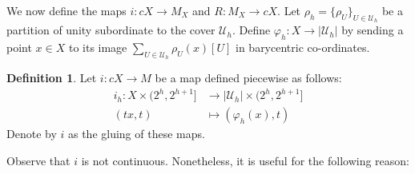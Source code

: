 \documentclass[a4paper,11pt]{article}
\theoremstyle{definition}
\newtheorem{definition}{Definition}[section]
\theoremstyle{plain}
\theoremstyle{remark}
\begin{document}
We now define the maps $i: cX\rightarrow M_{X}$ and $R:M_{X}\rightarrow cX$. Let $\rho_{h}= \{\rho_{U}\}_{U\in \mathcal{U}_{h}}$ be a partition of unity subordinate to the cover $\mathcal{U}_{h}$. Define $\varphi_{h}: X\rightarrow |\mathcal{U}_{h}|$ by sending a point $x\in X$ to its image $\sum_{U\in \mathcal{U}_{h}}\rho_{U}(x) [U]$ in barycentric co-ordinates. 

\begin{definition} Let $i: cX\rightarrow M$ be a map defined piecewise as follows:
\begin{align*}
i_h:X \times (2^{h},2^{h+1}] &\rightarrow |\mathcal{U}_{h}| \times (2^{h},2^{h+1}]\\
(tx,t) &\mapsto (\varphi_{h}(x),t)
\end{align*}
Denote by $i$ as the gluing of these maps. 
\end{definition}

Observe that $i$ is not continuous. Nonetheless, it is useful for the following reason:
\end{document}
